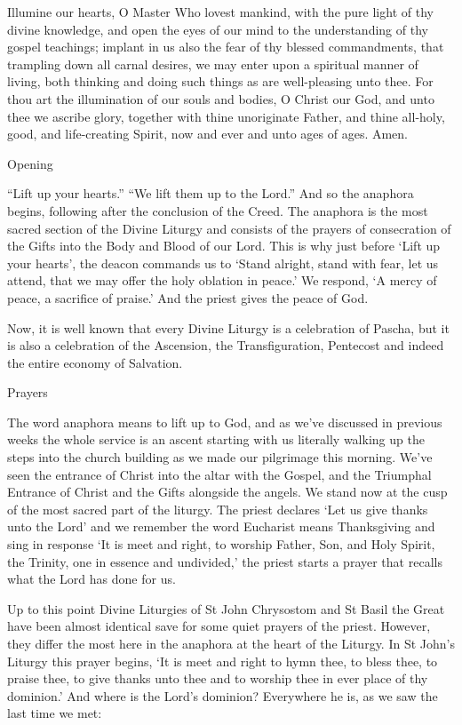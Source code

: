 \documentclass[
]{article}
\begin{document}
Illumine our hearts, O Master Who lovest mankind, with the pure light of
thy divine knowledge, and open the eyes of our mind to the understanding
of thy gospel teachings; implant in us also the fear of thy blessed
commandments, that trampling down all carnal desires, we may enter upon
a spiritual manner of living, both thinking and doing such things as are
well-pleasing unto thee. For thou art the illumination of our souls and
bodies, O Christ our God, and unto thee we ascribe glory, together with
thine unoriginate Father, and thine all-holy, good, and life-creating
Spirit, now and ever and unto ages of ages. Amen.

Opening

``Lift up your hearts.'' ``We lift them up to the Lord.'' And so the
anaphora begins, following after the conclusion of the Creed. The
anaphora is the most sacred section of the Divine Liturgy and consists
of the prayers of consecration of the Gifts into the Body and Blood of
our Lord. This is why just before `Lift up your hearts', the deacon
commands us to `Stand alright, stand with fear, let us attend, that we
may offer the holy oblation in peace.' We respond, `A mercy of peace, a
sacrifice of praise.' And the priest gives the peace of God.

Now, it is well known that every Divine Liturgy is a celebration of
Pascha, but it is also a celebration of the Ascension, the
Transfiguration, Pentecost and indeed the entire economy of Salvation.

Prayers

The word anaphora means to lift up to God, and as we've discussed in
previous weeks the whole service is an ascent starting with us literally
walking up the steps into the church building as we made our pilgrimage
this morning. We've seen the entrance of Christ into the altar with the
Gospel, and the Triumphal Entrance of Christ and the Gifts alongside the
angels. We stand now at the cusp of the most sacred part of the liturgy.
The priest declares `Let us give thanks unto the Lord' and we remember
the word Eucharist means Thanksgiving and sing in response `It is meet
and right, to worship Father, Son, and Holy Spirit, the Trinity, one in
essence and undivided,' the priest starts a prayer that recalls what the
Lord has done for us.

Up to this point Divine Liturgies of St John Chrysostom and St Basil the
Great have been almost identical save for some quiet prayers of the
priest. However, they differ the most here in the anaphora at the heart
of the Liturgy. In St John's Liturgy this prayer begins, `It is meet and
right to hymn thee, to bless thee, to praise thee, to give thanks unto
thee and to worship thee in ever place of thy dominion.' And where is
the Lord's dominion? Everywhere he is, as we saw the last time we met:
\end{document}
